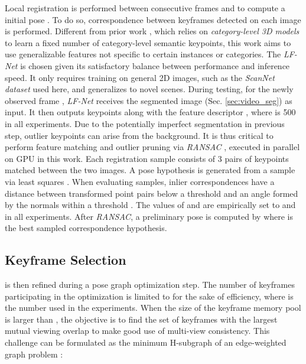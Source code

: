 \documentclass[letterpaper, 10 pt, conference]{ieeeconf}
\begin{document}
Local registration is performed between consecutive frames  and  to compute a initial pose . To do so, correspondence between keyframes detected on each image is performed. Different from prior work \cite{wang20196-pack}, which relies on \textit{category-level 3D models} to learn a fixed number of category-level semantic keypoints, this work aims to use generalizable features not specific to certain instances or categories. The \textit{LF-Net} \cite{ono2018lf} is chosen given its satisfactory balance between performance and inference speed. It only requires training on general 2D images, such as the \textit{ScanNet dataset} \cite{dai2017scannet} used here, and generalizes to novel scenes. During testing, for the newly observed frame , \textit{LF-Net} receives the segmented image (Sec. \ref{sec:video_seg}) as input. It then outputs  keypoints  along with the feature descriptor , where  is 500 in all experiments. Due to the potentially imperfect segmentation in previous step, outlier keypoints can arise from the background. It is thus critical to perform feature matching and outlier pruning via \textit{RANSAC} \cite{fischler1981random}, executed in parallel on GPU in this work. Each registration sample consists of 3 pairs of keypoints matched between the two images. A pose hypothesis is generated from a sample via least squares \cite{arun1987least}. When evaluating samples, inlier correspondences have a distance between transformed point pairs below a threshold  and an angle formed by the normals within a threshold . The values of  and  are empirically set to  and  in all experiments. After \textit{RANSAC}, a preliminary pose is computed by  where  is the best sampled correspondence hypothesis. 



\subsection{Keyframe Selection}
\label{sec:keyframe_selection}

 is then refined during a pose graph optimization step. The number of keyframes participating in the  optimization is limited to  for the sake of efficiency, where  is the number used in the experiments. When the size of the keyframe memory pool  is larger than , the objective is to find the set of keyframes with the largest mutual viewing overlap to make good use of multi-view consistency. This challenge can be formulated as the minimum H-subgraph of an edge-weighted graph problem \cite{vassilevska2006finding}:
\end{document}
